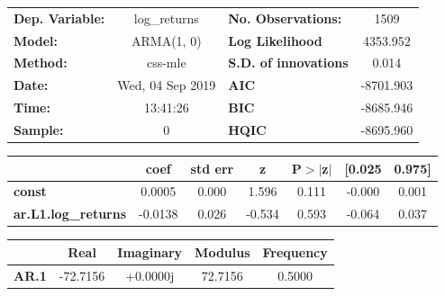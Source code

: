 \begin{center}
\begin{tabular}{lclc}
\toprule
\textbf{Dep. Variable:}     &        log\_returns       & \textbf{  No. Observations:  } &            1509            \\
\textbf{Model:}             &         ARMA(1, 0)        & \textbf{  Log Likelihood     } &          4353.952          \\
\textbf{Method:}            &          css-mle          & \textbf{  S.D. of innovations} &           0.014            \\
\textbf{Date:}              &      Wed, 04 Sep 2019     & \textbf{  AIC                } &         -8701.903          \\
\textbf{Time:}              &          13:41:26         & \textbf{  BIC                } &         -8685.946          \\
\textbf{Sample:}            &             0             & \textbf{  HQIC               } &         -8695.960          \\
\bottomrule
\end{tabular}
\begin{tabular}{lcccccc}
                            & \textbf{coef} & \textbf{std err} & \textbf{z} & \textbf{P$> |$z$|$} & \textbf{[0.025} & \textbf{0.975]}  \\
\midrule
\textbf{const}              &       0.0005  &        0.000     &     1.596  &         0.111        &       -0.000    &        0.001     \\
\textbf{ar.L1.log\_returns} &      -0.0138  &        0.026     &    -0.534  &         0.593        &       -0.064    &        0.037     \\
\bottomrule
\end{tabular}
\begin{tabular}{lcccc}
              & \textbf{            Real} & \textbf{         Imaginary} & \textbf{         Modulus} & \textbf{        Frequency}  \\
\midrule
\textbf{AR.1} &              -72.7156     &                +0.0000j     &               72.7156     &                0.5000       \\
\bottomrule
\end{tabular}
\end{center}
